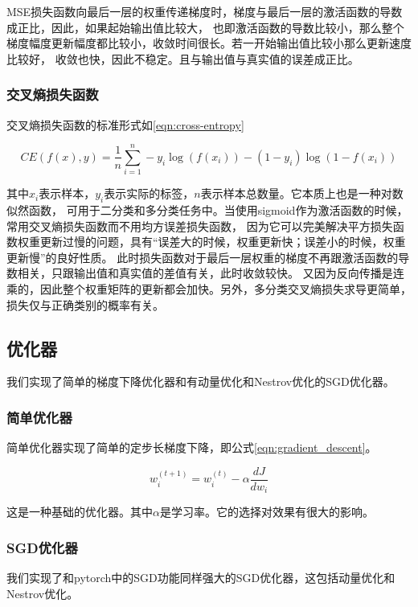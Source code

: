 \documentclass[a4paper,twoside,twocolumn]{article}
\begin{document}
\begin{spacing}{1.2}
MSE损失函数向最后⼀层的权重传递梯度时，梯度与最后⼀层的激活函数的导数成正⽐，因此，如果起始输出值⽐较⼤，
也即激活函数的导数⽐较⼩，那么整个梯度幅度更新幅度都⽐较⼩，收敛时间很长。若⼀开始输出值⽐较⼩那么更新速度⽐较好，
收敛也快，因此不稳定。且与输出值与真实值的误差成正⽐。

\subsubsection{交叉熵损失函数}

交叉熵损失函数的标准形式如\eqref{eqn:cross-entropy}

\begin{equation}
	\label{eqn:cross-entropy}
	CE(f(x), y) = \frac{1}{n} \sum_{i=1}^n -y_i \log(f(x_i)) - (1-y_i) \log(1-f(x_i))
\end{equation}

其中$x_i$表示样本，$y_i$表示实际的标签，$n$表示样本总数量。它本质上也是一种对数似然函数，
可用于二分类和多分类任务中。当使用sigmoid作为激活函数的时候，常用交叉熵损失函数而不用均方误差损失函数，
因为它可以完美解决平方损失函数权重更新过慢的问题，具有“误差大的时候，权重更新快；误差小的时候，权重更新慢”的良好性质。
此时损失函数对于最后⼀层权重的梯度不再跟激活函数的导数相关，只跟输出值和真实值的差值有关，此时收敛较快。
⼜因为反向传播是连乘的，因此整个权重矩阵的更新都会加快。另外，多分类交叉熵损失求导更简单，损失仅与正确类别的概率有关。


\subsection{优化器}

我们实现了简单的梯度下降优化器和有动量优化和Nestrov优化的SGD优化器。

\subsubsection{简单优化器}

简单优化器实现了简单的定步长梯度下降，即公式\eqref{eqn:gradient_descent}。

\begin{equation}
	\label{eqn:gradient_descent}
	w_i^{(t+1)} = w_i^{(t)} - \alpha \frac{dJ}{dw_i}
\end{equation}

这是一种基础的优化器。其中$\alpha$是学习率。它的选择对效果有很大的影响。

\subsubsection{SGD优化器}
我们实现了和pytorch中的SGD功能同样强大的SGD优化器，这包括动量优化和Nestrov优化。


\end{spacing}
\end{document}
